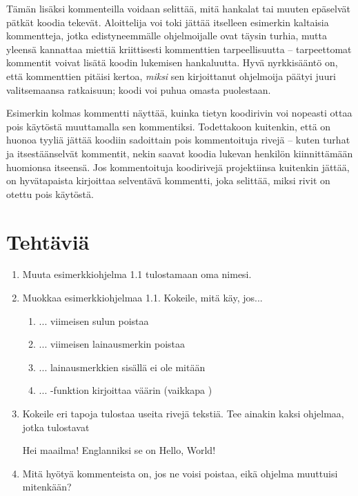 Tämän lisäksi kommenteilla voidaan selittää, mitä hankalat tai muuten epäselvät pätkät koodia tekevät. Aloittelija voi toki jättää itselleen esimerkin kaltaisia kommentteja, jotka edistyneemmälle ohjelmoijalle ovat täysin turhia, mutta yleensä kannattaa miettiä kriittisesti kommenttien tarpeellisuutta – tarpeettomat kommentit voivat lisätä koodin lukemisen hankaluutta. Hyvä nyrkkisääntö on, että kommenttien pitäisi kertoa, \textit{miksi} sen kirjoittanut ohjelmoija päätyi juuri valitsemaansa ratkaisuun; koodi voi puhua omasta puolestaan.

Esimerkin kolmas kommentti näyttää, kuinka tietyn koodirivin voi nopeasti ottaa pois käytöstä muuttamalla sen kommentiksi. Todettakoon kuitenkin, että on huonoa tyyliä jättää koodiin sadoittain pois kommentoituja rivejä – kuten turhat ja itsestäänselvät kommentit, nekin saavat koodia lukevan henkilön kiinnittämään huomionsa itseensä. Jos kommentoituja koodirivejä projektiinsa kuitenkin jättää, on hyvätapaista kirjoittaa selventävä kommentti, joka selittää, miksi rivit on otettu pois käytöstä.

\section{Tehtäviä}

\begin{enumerate}[\thesection .1]
\item Muuta esimerkkiohjelma 1.1 tulostamaan oma nimesi.
\item Muokkaa esimerkkiohjelmaa 1.1. Kokeile, mitä käy, jos...
	\begin{enumerate}
	\item ... viimeisen sulun poistaa
	\item ... viimeisen lainausmerkin poistaa
	\item ... lainausmerkkien sisällä ei ole mitään
	\item ... -funktion kirjoittaa väärin (vaikkapa )
	\end{enumerate}
\item Kokeile eri tapoja tulostaa useita rivejä tekstiä. Tee ainakin kaksi ohjelmaa, jotka tulostavat

\begin{output}
Hei maailma!
Englanniksi se on Hello, World!
\end{output}

\item Mitä hyötyä kommenteista on, jos ne voisi poistaa, eikä ohjelma muuttuisi mitenkään?

\end{enumerate}
